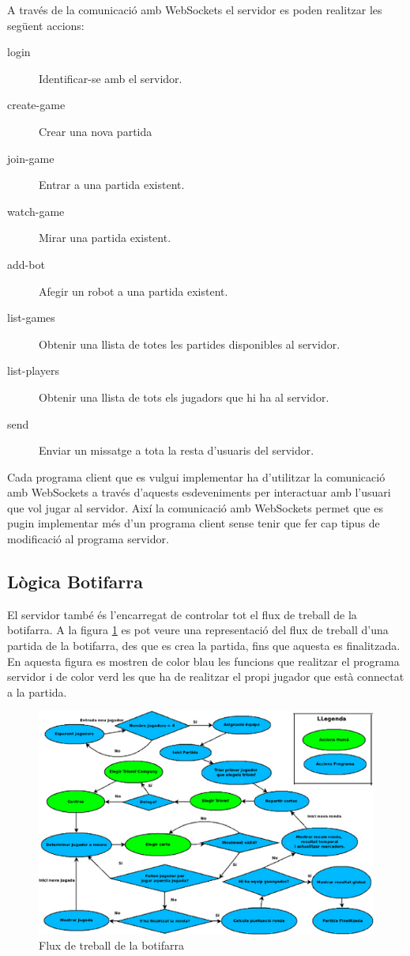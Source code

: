 A través de la comunicació amb WebSockets el servidor es poden realitzar les següent accions: 

\begin{description}
\item[login] {Identificar-se amb el servidor.}
\item[create-game] {Crear una nova partida}
\item[join-game] {Entrar a una partida existent.}
\item[watch-game] {Mirar una partida existent.}
\item[add-bot] {Afegir un robot a una partida existent.}
\item[list-games] {Obtenir una llista de totes les partides disponibles al servidor.}
\item[list-players] {Obtenir una llista de tots els jugadors que hi ha al servidor.}
\item[send] {Enviar un missatge a tota la resta d'usuaris del servidor. }
\end{description}

Cada programa client que es vulgui implementar ha d'utilitzar la comunicació amb WebSockets a través d'aquests esdeveniments per interactuar amb l'usuari que vol jugar al servidor. Així la comunicació amb WebSockets permet que es pugin implementar més d'un programa client sense tenir que fer cap tipus de modificació al programa servidor. 

\subsection{Lògica Botifarra}

El servidor també és l'encarregat de controlar tot el flux de treball de la botifarra. A la figura \ref{fig:buti-workflow} es pot veure una representació del flux de treball d'una partida de la botifarra, des que es crea la partida, fins que aquesta es finalitzada. En aquesta figura es mostren de color blau les funcions que realitzar el programa servidor i de color verd les que ha de realitzar el propi jugador que està connectat a la partida. 

\begin{figure}[htbp]
\hspace*{-1.5in}
\centering\includegraphics{img/butifarra_workflow.png}
\caption{Flux de treball de la botifarra}
\label{fig:buti-workflow}
\end{figure} 


